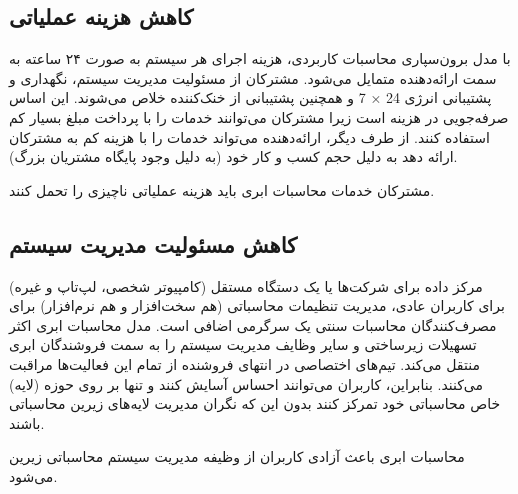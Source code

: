 \documentclass{book}
\begin{document}
            \subsection{کاهش هزینه عملیاتی}

                با مدل برون‌سپاری محاسبات کاربردی، هزینه اجرای هر سیستم به صورت ۲۴ ساعته به سمت ارائه‌دهنده متمایل می‌شود. مشترکان از مسئولیت مدیریت سیستم، نگهداری و پشتیبانی انرژی 24 × 7 و همچنین پشتیبانی از خنک‌کننده خلاص می‌شوند. این اساس صرفه‌جویی در هزینه است زیرا مشترکان می‌توانند خدمات را با پرداخت مبلغ بسیار کم استفاده کنند. از طرف دیگر، ارائه‌دهنده می‌تواند خدمات را با هزینه کم به مشترکان ارائه دهد به دلیل حجم کسب و کار خود (به دلیل وجود پایگاه مشتریان بزرگ).

                \begin{addinfo}
                    
                    مشترکان خدمات محاسبات ابری باید هزینه عملیاتی ناچیزی را تحمل کنند.

                \end{addinfo}

            \subsection{کاهش مسئولیت مدیریت سیستم}

                مرکز داده برای شرکت‌ها یا یک دستگاه مستقل (کامپیوتر شخصی، لپ‌تاپ و غیره) برای کاربران عادی، مدیریت تنظیمات محاسباتی (هم سخت‌افزار و هم نرم‌افزار) برای مصرف‌کنندگان محاسبات سنتی یک سرگرمی اضافی است. مدل محاسبات ابری اکثر تسهیلات زیرساختی و سایر وظایف مدیریت سیستم را به سمت فروشندگان ابری منتقل می‌کند. تیم‌های اختصاصی در انتهای فروشنده از تمام این فعالیت‌ها مراقبت می‌کنند. بنابراین، کاربران می‌توانند احساس آسایش کنند و تنها بر روی حوزه (لایه) خاص محاسباتی خود تمرکز کنند بدون این که نگران مدیریت لایه‌های زیرین محاسباتی باشند.

                \begin{addinfo}
                    
                    محاسبات ابری باعث آزادی کاربران از وظیفه مدیریت سیستم محاسباتی زیرین می‌شود.

                \end{addinfo}
                

\end{document}
